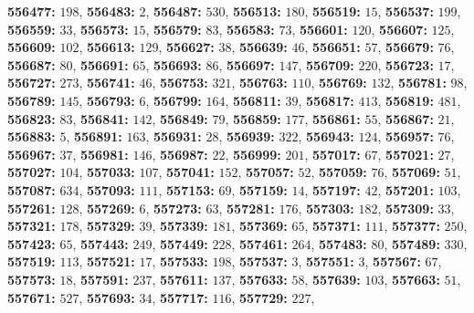 \textsf{\bfseries 556477:} $198$, \textsf{\bfseries 556483:} $2$, \textsf{\bfseries 556487:} $530$, \textsf{\bfseries 556513:} $180$, \textsf{\bfseries 556519:} $15$, \textsf{\bfseries 556537:} $199$, \textsf{\bfseries 556559:} $33$, \textsf{\bfseries 556573:} $15$, \textsf{\bfseries 556579:} $83$, \textsf{\bfseries 556583:} $73$, \textsf{\bfseries 556601:} $120$, \textsf{\bfseries 556607:} $125$, \textsf{\bfseries 556609:} $102$, \textsf{\bfseries 556613:} $129$, \textsf{\bfseries 556627:} $38$, \textsf{\bfseries 556639:} $46$, \textsf{\bfseries 556651:} $57$, \textsf{\bfseries 556679:} $76$, \textsf{\bfseries 556687:} $80$, \textsf{\bfseries 556691:} $65$, \textsf{\bfseries 556693:} $86$, \textsf{\bfseries 556697:} $147$, \textsf{\bfseries 556709:} $220$, \textsf{\bfseries 556723:} $17$, \textsf{\bfseries 556727:} $273$, \textsf{\bfseries 556741:} $46$, \textsf{\bfseries 556753:} $321$, \textsf{\bfseries 556763:} $110$, \textsf{\bfseries 556769:} $132$, \textsf{\bfseries 556781:} $98$, \textsf{\bfseries 556789:} $145$, \textsf{\bfseries 556793:} $6$, \textsf{\bfseries 556799:} $164$, \textsf{\bfseries 556811:} $39$, \textsf{\bfseries 556817:} $413$, \textsf{\bfseries 556819:} $481$, \textsf{\bfseries 556823:} $83$, \textsf{\bfseries 556841:} $142$, \textsf{\bfseries 556849:} $79$, \textsf{\bfseries 556859:} $177$, \textsf{\bfseries 556861:} $55$, \textsf{\bfseries 556867:} $21$, \textsf{\bfseries 556883:} $5$, \textsf{\bfseries 556891:} $163$, \textsf{\bfseries 556931:} $28$, \textsf{\bfseries 556939:} $322$, \textsf{\bfseries 556943:} $124$, \textsf{\bfseries 556957:} $76$, \textsf{\bfseries 556967:} $37$, \textsf{\bfseries 556981:} $146$, \textsf{\bfseries 556987:} $22$, \textsf{\bfseries 556999:} $201$, \textsf{\bfseries 557017:} $67$, \textsf{\bfseries 557021:} $27$, \textsf{\bfseries 557027:} $104$, \textsf{\bfseries 557033:} $107$, \textsf{\bfseries 557041:} $152$, \textsf{\bfseries 557057:} $52$, \textsf{\bfseries 557059:} $76$, \textsf{\bfseries 557069:} $51$, \textsf{\bfseries 557087:} $634$, \textsf{\bfseries 557093:} $111$, \textsf{\bfseries 557153:} $69$, \textsf{\bfseries 557159:} $14$, \textsf{\bfseries 557197:} $42$, \textsf{\bfseries 557201:} $103$, \textsf{\bfseries 557261:} $128$, \textsf{\bfseries 557269:} $6$, \textsf{\bfseries 557273:} $63$, \textsf{\bfseries 557281:} $176$, \textsf{\bfseries 557303:} $182$, \textsf{\bfseries 557309:} $33$, \textsf{\bfseries 557321:} $178$, \textsf{\bfseries 557329:} $39$, \textsf{\bfseries 557339:} $181$, \textsf{\bfseries 557369:} $65$, \textsf{\bfseries 557371:} $111$, \textsf{\bfseries 557377:} $250$, \textsf{\bfseries 557423:} $65$, \textsf{\bfseries 557443:} $249$, \textsf{\bfseries 557449:} $228$, \textsf{\bfseries 557461:} $264$, \textsf{\bfseries 557483:} $80$, \textsf{\bfseries 557489:} $330$, \textsf{\bfseries 557519:} $113$, \textsf{\bfseries 557521:} $17$, \textsf{\bfseries 557533:} $198$, \textsf{\bfseries 557537:} $3$, \textsf{\bfseries 557551:} $3$, \textsf{\bfseries 557567:} $67$, \textsf{\bfseries 557573:} $18$, \textsf{\bfseries 557591:} $237$, \textsf{\bfseries 557611:} $137$, \textsf{\bfseries 557633:} $58$, \textsf{\bfseries 557639:} $103$, \textsf{\bfseries 557663:} $51$, \textsf{\bfseries 557671:} $527$, \textsf{\bfseries 557693:} $34$, \textsf{\bfseries 557717:} $116$, \textsf{\bfseries 557729:} $227$, 
